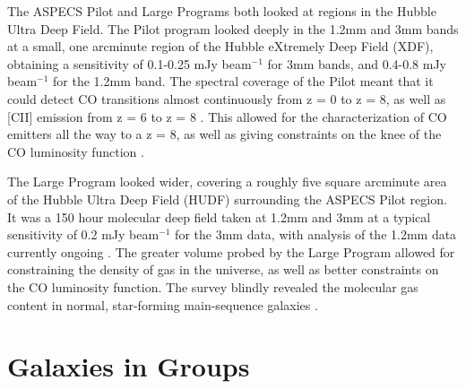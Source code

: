 \documentclass[twoside,single]{lion-msc}
\begin{document}
The ASPECS Pilot and Large Programs both looked at regions in the Hubble Ultra Deep Field. The Pilot program looked deeply in the 1.2mm and 3mm bands at a small, one arcminute region of the Hubble eXtremely Deep Field (XDF), obtaining a sensitivity of 0.1-0.25 mJy beam$^{-1}$ for 3mm bands, and 0.4-0.8 mJy beam$^{-1}$ for the 1.2mm band. The spectral coverage of the Pilot meant that it could detect CO transitions almost continuously from z = 0 to z = 8, as well as [CII] emission from z = 6 to z = 8 \cite{walter2016alma}. This allowed for the characterization of CO emitters all the way to a z = 8, as well as giving constraints on the knee of the CO luminosity function \cite{walter2016alma}. 

The Large Program looked wider, covering a roughly five square arcminute area of the Hubble Ultra Deep Field (HUDF) surrounding the ASPECS Pilot region. It was a 150 hour molecular deep field taken at 1.2mm and 3mm at a typical sensitivity of 0.2 mJy beam$^{-1}$ for the 3mm data, with analysis of the 1.2mm data currently ongoing \cite{decarli2019alma}. The greater volume probed by the Large Program allowed for constraining the density of gas in the universe, as well as better constraints on the CO luminosity function. The survey blindly revealed the molecular gas content in normal, star-forming main-sequence galaxies \cite{decarli2019alma}. 



\section{Galaxies in Groups}
\end{document}
